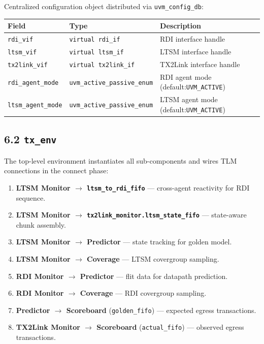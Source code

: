 \documentclass[11pt,a4paper]{article}
\begin{document}
Centralized configuration object distributed via \texttt{uvm\_config\_db}:


\begin{tabularx}{\textwidth}{|X|X|X|}
\hline
\textbf{Field} & \textbf{Type} & \textbf{Description} \\
\hline
\texttt{rdi\_vif} & \texttt{virtual rdi\_if} & RDI interface handle \\
\hline
\texttt{ltsm\_vif} & \texttt{virtual ltsm\_if} & LTSM interface handle \\
\hline
\texttt{tx2link\_vif} & \texttt{virtual tx2link\_if} & TX2Link interface handle \\
\hline
\texttt{rdi\_agent\_mode} & \texttt{uvm\_active\_passive\_enum} & RDI agent mode (default:\texttt{UVM\_ACTIVE}) \\
\hline
\texttt{ltsm\_agent\_mode} & \texttt{uvm\_active\_passive\_enum} & LTSM agent mode (default:\texttt{UVM\_ACTIVE}) \\
\hline
\end{tabularx}


\subsection{6.2 \texttt{tx\_env}}

The top-level environment instantiates all sub-components and wires TLM connections in the connect phase:

\begin{enumerate}
  \item \textbf{LTSM Monitor $\rightarrow$ \texttt{ltsm\_to\_rdi\_fifo}} --- cross-agent reactivity for RDI sequence.
  \item \textbf{LTSM Monitor $\rightarrow$ \texttt{tx2link\_monitor.ltsm\_state\_fifo}} --- state-aware chunk assembly.
  \item \textbf{LTSM Monitor $\rightarrow$ Predictor} --- state tracking for golden model.
  \item \textbf{LTSM Monitor $\rightarrow$ Coverage} --- LTSM covergroup sampling.
  \item \textbf{RDI Monitor $\rightarrow$ Predictor} --- flit data for datapath prediction.
  \item \textbf{RDI Monitor $\rightarrow$ Coverage} --- RDI covergroup sampling.
  \item \textbf{Predictor $\rightarrow$ Scoreboard} (\texttt{golden\_fifo}) --- expected egress transactions.
  \item \textbf{TX2Link Monitor $\rightarrow$ Scoreboard} (\texttt{actual\_fifo}) --- observed egress transactions.
\end{enumerate}
\end{document}
